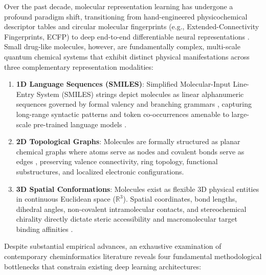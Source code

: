 \documentclass[10pt,twocolumn]{article}
\begin{document}
Over the past decade, molecular representation learning has undergone a profound paradigm shift, transitioning from hand-engineered physicochemical descriptor tables and circular molecular fingerprints (e.g., Extended-Connectivity Fingerprints, ECFP) to deep end-to-end differentiable neural representations \cite{gilmer2017neural, duvenaud2015convolutional}. Small drug-like molecules, however, are fundamentally complex, multi-scale quantum chemical systems that exhibit distinct physical manifestations across three complementary representation modalities:
\begin{enumerate}
    \item \textbf{1D Language Sequences (SMILES)}: Simplified Molecular-Input Line-Entry System (SMILES) strings depict molecules as linear alphanumeric sequences governed by formal valency and branching grammars \cite{weininger1988smiles}, capturing long-range syntactic patterns and token co-occurrences amenable to large-scale pre-trained language models \cite{wang2019smiles, honda2019smiles, chithrananda2020chemberta, jiang2022multigran}.
    \item \textbf{2D Topological Graphs}: Molecules are formally structured as planar chemical graphs where atoms serve as nodes and covalent bonds serve as edges \cite{yang2019analyzing, hu2020strategies, rong2020self, yang2021fragat}, preserving valence connectivity, ring topology, functional substructures, and localized electronic configurations.
    \item \textbf{3D Spatial Conformations}: Molecules exist as flexible 3D physical entities in continuous Euclidean space ($\mathbb{R}^3$). Spatial coordinates, bond lengths, dihedral angles, non-covalent intramolecular contacts, and stereochemical chirality directly dictate steric accessibility and macromolecular target binding affinities \cite{schutt2018schnet, klicpera2020fast, satorras2021en, fang2022geometry, zhou2023unimol}.
\end{enumerate}

Despite substantial empirical advances, an exhaustive examination of contemporary cheminformatics literature reveals four fundamental methodological bottlenecks that constrain existing deep learning architectures:
\end{document}
